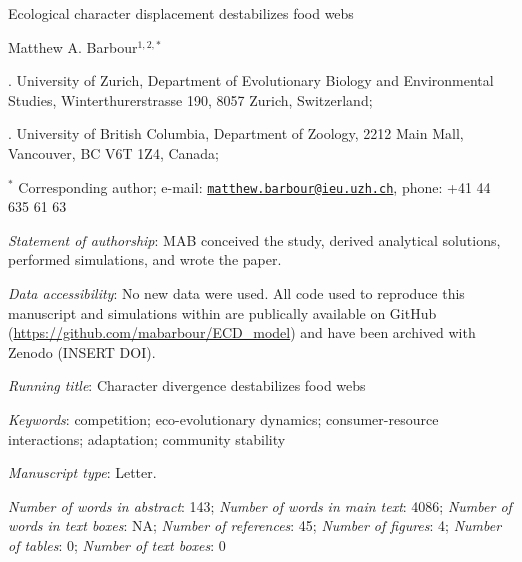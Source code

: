 \documentclass[11pt,]{article}
\title{}
\author{}
\date{}
\begin{document}
\vspace*{0.1cm}

\begin{center} \LARGE Ecological character displacement destabilizes food webs \end{center}

\bigskip

\begin{center} \large Matthew A. Barbour$^{1,2,\ast}$ \normalsize \end{center}

\bigskip

. University of Zurich, Department of Evolutionary Biology
and Environmental Studies, Winterthurerstrasse 190, 8057 Zurich,
Switzerland;

. University of British Columbia, Department of Zoology, 2212
Main Mall, Vancouver, BC V6T 1Z4, Canada;

\(^\ast\) Corresponding author; e-mail:
\href{mailto:matthew.barbour@ieu.uzh.ch}{\nolinkurl{matthew.barbour@ieu.uzh.ch}},
phone: +41 44 635 61 63

\bigskip

\emph{Statement of authorship}: MAB conceived the study, derived
analytical solutions, performed simulations, and wrote the paper.

\bigskip

\emph{Data accessibility}: No new data were used. All code used to
reproduce this manuscript and simulations within are publically
available on GitHub (\url{https://github.com/mabarbour/ECD_model}) and
have been archived with Zenodo (INSERT DOI).

\bigskip

\emph{Running title}: Character divergence destabilizes food webs

\bigskip

\emph{Keywords}: competition; eco-evolutionary dynamics;
consumer-resource interactions; adaptation; community stability

\bigskip

\emph{Manuscript type}: Letter.

\bigskip

\emph{Number of words in abstract}: 143; \emph{Number of words in main
text}: 4086; \emph{Number of words in text boxes}: NA; \emph{Number of
references}: 45; \emph{Number of figures}: 4; \emph{Number of tables}:
0; \emph{Number of text boxes}: 0

\linenumbers{} \modulolinenumbers[3]
\end{document}

